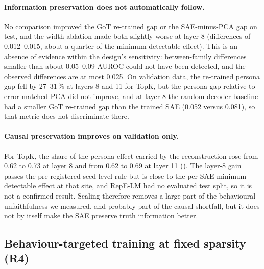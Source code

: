 \paragraph{Information preservation does not automatically follow.} No comparison improved the GoT re-trained gap or
the SAE-minus-PCA gap on test, and the width ablation made both slightly worse at layer 8 (differences of 0.012--0.015,
about a quarter of the minimum detectable effect). This is an absence of evidence within the design's sensitivity:
between-family differences smaller than about 0.05--0.09 AUROC could not have been detected, and the observed
differences are at most 0.025. On validation data, the re-trained persona gap fell by 27--31\,\% at layers 8 and 11 for
TopK, but the persona gap relative to error-matched PCA did not improve, and at layer 8 the random-decoder baseline had a
smaller GoT re-trained gap than the trained SAE (0.052 versus 0.081), so that metric does not discriminate there.

\paragraph{Causal preservation improves on validation only.} For TopK, the share of the persona effect carried by the
reconstruction rose from 0.62 to 0.73 at layer 8 and from 0.62 to 0.69 at layer 11 (). The layer-8
gain passes the pre-registered seed-level rule but is close to the per-SAE minimum detectable effect at that site, and
RepE-LM had no evaluated test split, so it is not a confirmed result. Scaling therefore removes a large part of the
behavioural unfaithfulness we measured, and probably part of the causal shortfall, but it does not by itself make the
SAE preserve truth information better.



\subsection{Behaviour-targeted training at fixed sparsity (R4)}\label{sec:r4}

